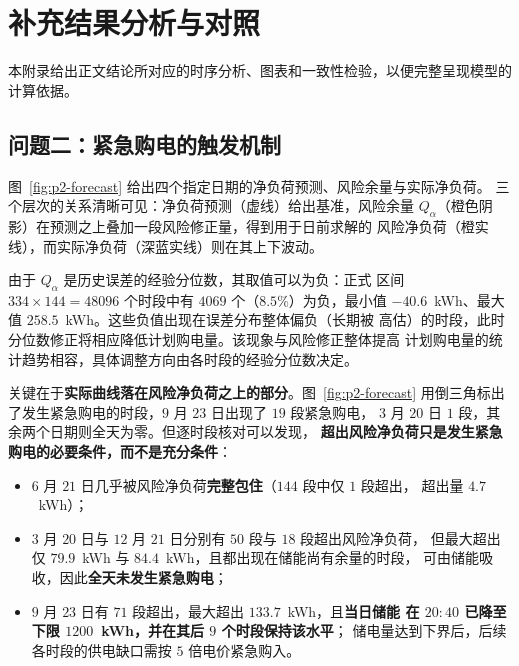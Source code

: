 
\section{补充结果分析与对照}
\label{app:moved}

本附录给出正文结论所对应的时序分析、图表和一致性检验，以便完整呈现模型的
计算依据。

\subsection{问题二：紧急购电的触发机制}

图~\ref{fig:p2-forecast} 给出四个指定日期的净负荷预测、风险余量与实际净负荷。
三个层次的关系清晰可见：净负荷预测（虚线）给出基准，风险余量
$Q_{\alpha}$（橙色阴影）在预测之上叠加一段风险修正量，得到用于日前求解的
风险净负荷（橙实线），而实际净负荷（深蓝实线）则在其上下波动。

由于 $Q_{\alpha}$ 是历史误差的经验分位数，其取值可以为负：正式
区间 $334\times144=48096$ 个时段中有 $4069$ 个（$8.5\%$）为负，最小值
$-40.6$~kWh、最大值 $258.5$~kWh。这些负值出现在误差分布整体偏负（长期被
高估）的时段，此时分位数修正将相应降低计划购电量。该现象与风险修正整体提高
计划购电量的统计趋势相容，具体调整方向由各时段的经验分位数决定。

关键在于\textbf{实际曲线落在风险净负荷之上的部分}。图~\ref{fig:p2-forecast}
用倒三角标出了发生紧急购电的时段，$9$ 月 $23$ 日出现了 $19$ 段紧急购电，
$3$ 月 $20$ 日 $1$ 段，其余两个日期则全天为零。但逐时段核对可以发现，
\textbf{超出风险净负荷只是发生紧急购电的必要条件，而不是充分条件}：

\begin{itemize}
  \item $6$ 月 $21$ 日几乎被风险净负荷\textbf{完整包住}（$144$ 段中仅 $1$ 段超出，
        超出量 $4.7$~kWh）；
  \item $3$ 月 $20$ 日与 $12$ 月 $21$ 日分别有 $50$ 段与 $18$ 段超出风险净负荷，
        但最大超出仅 $79.9$~kWh 与 $84.4$~kWh，且都出现在储能尚有余量的时段，
        可由储能吸收，因此\textbf{全天未发生紧急购电}；
  \item $9$ 月 $23$ 日有 $71$ 段超出，最大超出 $133.7$~kWh，且\textbf{当日储能
        在 $20{:}40$ 已降至下限 $1200$~kWh，并在其后 $9$ 个时段保持该水平}；
        储电量达到下界后，后续各时段的供电缺口需按 $5$ 倍电价紧急购入。
\end{itemize}

